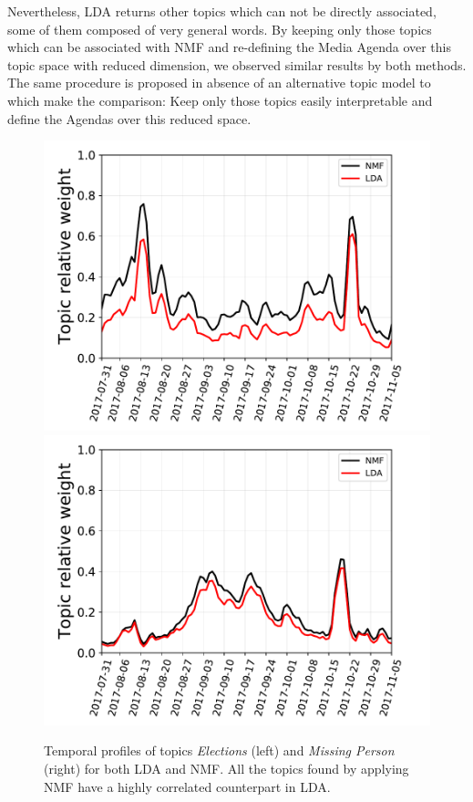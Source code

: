\documentclass[a4paper, 12pt]{article}
\begin{document}
\par Nevertheless, LDA returns other topics which can not be directly associated, some of them composed of very general words. 
By keeping only those topics which can be associated with NMF and re-defining the Media Agenda over this topic space with reduced dimension, we observed similar results by both methods.  
The same procedure is proposed in absence of an alternative topic model to which make the comparison: Keep only those topics easily interpretable and define the Agendas over this reduced space.
 
\begin{figure}[H]
\centering
\includegraphics[scale = 0.4]{images/FigA2.pdf}
\includegraphics[scale = 0.4]{images/FigA1.pdf}
\caption{Temporal profiles of topics \emph{Elections} (left) and \emph{Missing Person} (right) for both LDA and NMF. All the topics found by applying NMF have a highly correlated counterpart in LDA.} 
\label{fig:temporal_profiles_nmf_lda}
\end{figure}
\end{document}
